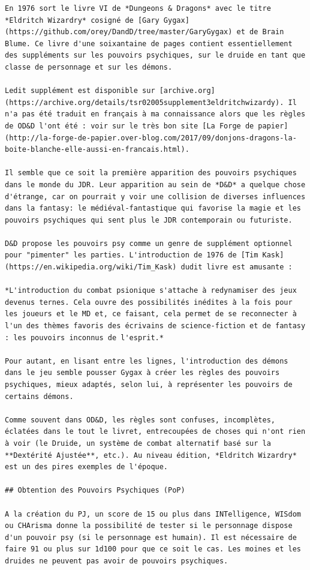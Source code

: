 \documentclass[11pt]{article}
\begin{document}
{\begin{verbatim}
En 1976 sort le livre VI de *Dungeons & Dragons* avec le titre *Eldritch Wizardry* cosigné de [Gary Gygax](https://github.com/orey/DandD/tree/master/GaryGygax) et de Brain Blume. Ce livre d'une soixantaine de pages contient essentiellement des suppléments sur les pouvoirs psychiques, sur le druide en tant que classe de personnage et sur les démons.

Ledit supplément est disponible sur [archive.org](https://archive.org/details/tsr02005supplement3eldritchwizardy). Il n'a pas été traduit en français à ma connaissance alors que les règles de OD&D l'ont été : voir sur le très bon site [La Forge de papier](http://la-forge-de-papier.over-blog.com/2017/09/donjons-dragons-la-boite-blanche-elle-aussi-en-francais.html).

Il semble que ce soit la première apparition des pouvoirs psychiques dans le monde du JDR. Leur apparition au sein de *D&D* a quelque chose d'étrange, car on pourrait y voir une collision de diverses influences dans la fantasy: le médiéval-fantastique qui favorise la magie et les pouvoirs psychiques qui sent plus le JDR contemporain ou futuriste.

D&D propose les pouvoirs psy comme un genre de supplément optionnel pour "pimenter" les parties. L'introduction de 1976 de [Tim Kask](https://en.wikipedia.org/wiki/Tim_Kask) dudit livre est amusante :

*L'introduction du combat psionique s'attache à redynamiser des jeux devenus ternes. Cela ouvre des possibilités inédites à la fois pour les joueurs et le MD et, ce faisant, cela permet de se reconnecter à l'un des thèmes favoris des écrivains de science-fiction et de fantasy : les pouvoirs inconnus de l'esprit.*

Pour autant, en lisant entre les lignes, l'introduction des démons dans le jeu semble pousser Gygax à créer les règles des pouvoirs psychiques, mieux adaptés, selon lui, à représenter les pouvoirs de certains démons.

Comme souvent dans OD&D, les règles sont confuses, incomplètes, éclatées dans le tout le livret, entrecoupées de choses qui n'ont rien à voir (le Druide, un système de combat alternatif basé sur la **Dextérité Ajustée**, etc.). Au niveau édition, *Eldritch Wizardry* est un des pires exemples de l'époque.

## Obtention des Pouvoirs Psychiques (PoP)

A la création du PJ, un score de 15 ou plus dans INTelligence, WISdom ou CHArisma donne la possibilité de tester si le personnage dispose d'un pouvoir psy (si le personnage est humain). Il est nécessaire de faire 91 ou plus sur 1d100 pour que ce soit le cas. Les moines et les druides ne peuvent pas avoir de pouvoirs psychiques.


\end{verbatim}}
\end{document}
